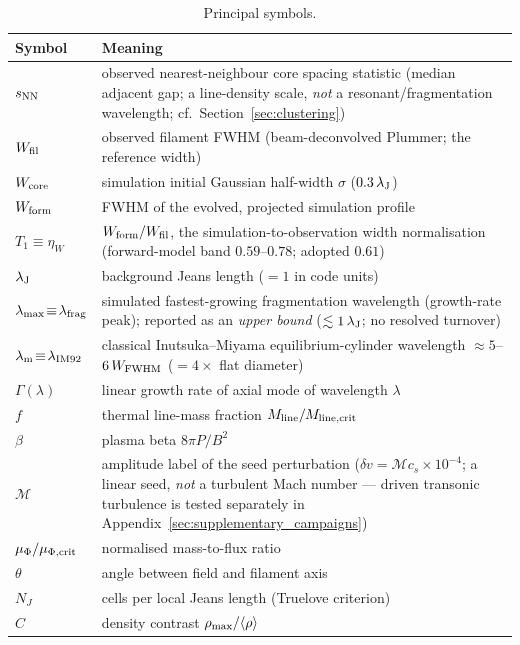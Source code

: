 \documentclass[usenatbib,twoside,twocolumn]{mnras}
\begin{document}
\begin{table}
\caption{Principal symbols.}
\label{tab:symbols}
\footnotesize
\setlength{\tabcolsep}{4pt}
\begin{tabular}{lp{6.1cm}}
\toprule
Symbol & Meaning \\
\midrule
$s_{\rm NN}$ & observed nearest-neighbour core spacing statistic (median adjacent gap; a line-density scale, \emph{not} a resonant/fragmentation wavelength; cf.\ Section~\ref{sec:clustering}) \\
$W_{\rm fil}$ & observed filament FWHM (beam-deconvolved Plummer; the reference width) \\
$W_{\rm core}$ & simulation initial Gaussian half-width $\sigma$ ($0.3\,\lambda_{\rm J}$) \\
$W_{\rm form}$ & FWHM of the evolved, projected simulation profile \\
$T_1\!\equiv\!\eta_W$ & $W_{\rm form}/W_{\rm fil}$, the simulation-to-observation width normalisation (forward-model band $0.59$--$0.78$; adopted $0.61$) \\
$\lambda_{\rm J}$ & background Jeans length ($=1$ in code units) \\
$\lambda_{\rm max}\!\equiv\!\lambda_{\rm frag}$ & simulated fastest-growing fragmentation wavelength (growth-rate peak); reported as an \emph{upper bound} ($\lesssim1\,\lambda_{\rm J}$; no resolved turnover) \\
$\lambda_{\rm m}\!\equiv\!\lambda_{\rm IM92}$ & classical Inutsuka--Miyama equilibrium-cylinder wavelength $\approx5$--$6\,W_{\rm FWHM}$ ($=4\times$ flat diameter) \\
$\Gamma(\lambda)$ & linear growth rate of axial mode of wavelength $\lambda$ \\
$f$ & thermal line-mass fraction $M_{\rm line}/M_{\rm line,crit}$ \\
$\beta$ & plasma beta $8\pi P/B^2$ \\
$\mathcal{M}$ & amplitude label of the seed perturbation ($\delta v=\mathcal{M}c_s\times10^{-4}$; a linear seed, \emph{not} a turbulent Mach number --- driven transonic turbulence is tested separately in Appendix~\ref{sec:supplementary_campaigns}) \\
$\mu_\Phi/\mu_{\Phi,\rm crit}$ & normalised mass-to-flux ratio \\
$\theta$ & angle between field and filament axis \\
$N_J$ & cells per local Jeans length (Truelove criterion) \\
$C$ & density contrast $\rho_{\rm max}/\langle\rho\rangle$ \\
\bottomrule
\end{tabular}
\end{table}
\end{document}
